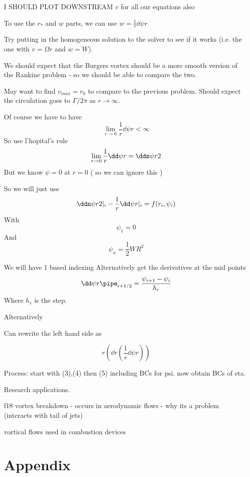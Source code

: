 \documentclass{X:/Documents/Coding/Latex/myreport}
\begin{document}


I SHOULD PLOT DOWNSTREAM $v$ for all our equations also



To use the $r_*$ and $w$ parts, we can use $w = \frac1r\dd\psi r $


Try putting in the homogeneous solution to the solver to see if it works (i.e. the one with $v = \Omega r$ and $w=W$).

We should expect that the Burgers vortex should be a more smooth version of the Rankine problem - so we should be able to compare the two.

May want to find $v_{max} = r_0$ to compare to the previous problem.
Should expect the circulation goes to $\Gamma / 2 \pi$ as $r\to \infty$.




Of course we have to have
\[\lim_{r\to 0} \frac1r \dd\psi r < \infty\]
So use l'hopital's rule
\[\lim_{r\to 0} \frac1r \dd\psi r = \ddn\psi r2\]
But we know $\psi = 0$ at $r=0$ ( so we can ignore this )



So we will just use
\[\ddn \psi r2 |_i - \frac1r \dd\psi r|_i = f(r_i,\psi_i)\]
With 
\[\psi_1 = 0\]
And
\[\psi_n = \frac12 WR^2\]

We will have 1 based indexing 
Alternatively 
get the derivatives at the mid points
\[\dd\psi r\pipe_{i+1/2} = \frac{\psi_{i+1} - \psi_i}{h_r}\]
Where $h_r$ is the step.





Alternatively


Can rewrite the left hand side as

\[r\left(\dd{}r \left(\frac1r \dd\psi r\right)\right)\]





Process: start with (3),(4) then (5) including BCs for psi. now obtain BCs of eta.

Research applications.

f18 vortex breakdown - occurs in aerodynamic flows - why its a problem (interacts with tail of jets)

vortical flows used in combustion devices


\clearpage
\section{Appendix}
\end{document}
